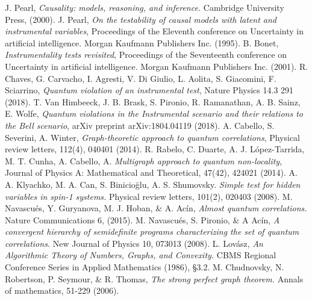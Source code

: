 \documentclass[letterpaper]{article}
\begin{document}
\begin{thebibliography}{}
     J. Pearl, 
        {\em Causality: models, reasoning, and inference.}
        Cambridge University Press, (2000).
     J. Pearl, 
        {\em On the testability of causal models with latent and instrumental variables}, 
        Proceedings of the Eleventh conference on Uncertainty in artificial
        intelligence. Morgan Kaufmann Publishers Inc. (1995).
     B. Bonet, {\em Instrumentality tests revisited},
        Proceedings of the Seventeenth conference on Uncertainty in artificial
        intelligence. Morgan Kaufmann Publishers Inc. (2001).
     R. Chaves, G. Carvacho, I. Agresti, V. Di Giulio, L. Aolita,
        S. Giacomini, F. Sciarrino, 
        {\em Quantum violation of an instrumental test}, 
        Nature Physics 14.3 291 (2018).
      T. Van Himbeeck, J. B. Brask, S. Pironio, R. Ramanathan, A. B. Sainz, E. Wolfe, 
        {\em Quantum violations in the Instrumental scenario and their relations to the Bell scenario},
        arXiv preprint arXiv:1804.04119 (2018).
      A. Cabello, S. Severini, A. Winter,
         {\em Graph-theoretic approach to quantum correlations}, 
         Physical review letters, 112(4), 040401 (2014).
      R. Rabelo, C. Duarte, A. J.  López-Tarrida, M. T. Cunha, A. Cabello, A. 
         {\em Multigraph approach to quantum non-locality},
         Journal of Physics A: Mathematical and Theoretical, 47(42), 424021
         (2014).
      A. A. Klyachko, M. A. Can, S. Binicioğlu, A. S. Shumovsky.
         {\em Simple test for hidden variables in spin-1 systems.}
         Physical review letters, 101(2), 020403 (2008).
      M. Navascués, Y. Guryanova, M. J. Hoban, \& A. Acín, 
         {\em Almost quantum correlations.}
         Nature Communications 6, (2015).
      M. Navascués, S. Pironio, \& A Acín, 
         {\em A convergent hierarchy of semidefinite programs characterizing the
         set of quantum correlations.}
         New Journal of Physics 10, 073013 (2008).
      L. Lovász, 
         {\em An Algorithmic Theory of Numbers, Graphs, and Convexity.}
         CBMS Regional Conference Series in Applied Mathematics (1986), §3.2.
      M. Chudnovsky, N. Robertson, P. Seymour, \& R. Thomas, 
         {\em The strong perfect graph theorem.} 
         Annals of mathematics, 51-229 (2006).
\end{thebibliography}

\end{document}
